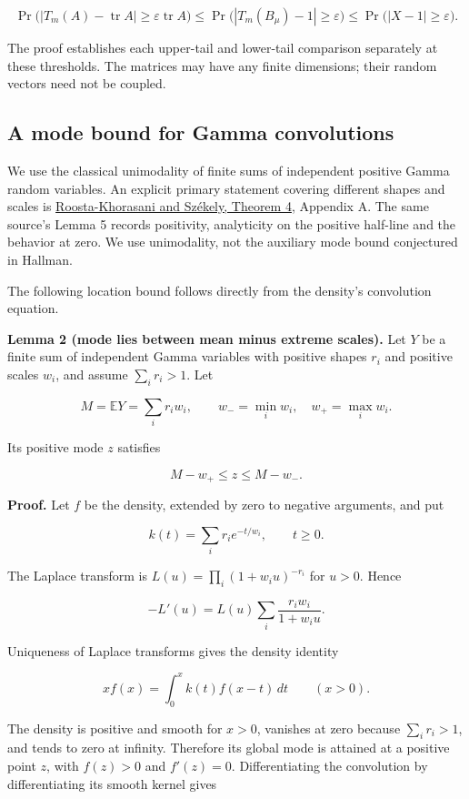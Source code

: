 \documentclass[10pt,a4paper]{article}
\begin{document}
\[
\Pr\bigl(|T_m(A)-\operatorname{tr}A|\ge\varepsilon\operatorname{tr}A\bigr)
\le\Pr\bigl(|T_m(B_\mu)-1|\ge\varepsilon\bigr)
\le\Pr\bigl(|X-1|\ge\varepsilon\bigr).
\]

The proof establishes each upper-tail and lower-tail comparison
separately at these thresholds. The matrices may have any finite
dimensions; their random vectors need not be coupled.

\subsection{A mode bound for Gamma
convolutions}\label{a-mode-bound-for-gamma-convolutions}

We use the classical unimodality of finite sums of independent positive
Gamma random variables. An explicit primary statement covering different
shapes and scales is
\href{https://arxiv.org/html/1601.04731v1}{Roosta-Khorasani and Székely,
Theorem 4}, Appendix A. The same source's Lemma 5 records positivity,
analyticity on the positive half-line and the behavior at zero. We use
unimodality, not the auxiliary mode bound conjectured in Hallman.

The following location bound follows directly from the density's
convolution equation.

\textbf{Lemma 2 (mode lies between mean minus extreme scales).} Let
\(Y\) be a finite sum of independent Gamma variables with positive
shapes \(r_i\) and positive scales \(w_i\), and assume \(\sum_i r_i>1\).
Let

\[
M=\mathbb EY=\sum_i r_iw_i,
\qquad w_- =\min_iw_i,\quad w_+=\max_iw_i.
\]

Its positive mode \(z\) satisfies

\[
M-w_+\le z\le M-w_-.
\]

\textbf{Proof.} Let \(f\) be the density, extended by zero to negative
arguments, and put

\[
k(t)=\sum_i r_i e^{-t/w_i},\qquad t\ge0.
\]

The Laplace transform is \(L(u)=\prod_i(1+w_i u)^{-r_i}\) for \(u>0\).
Hence

\[
-L'(u)=L(u)\sum_i\frac{r_iw_i}{1+w_i u}.
\]

Uniqueness of Laplace transforms gives the density identity

\[
xf(x)=\int_0^x k(t)f(x-t)\,dt\qquad(x>0).
\]

The density is positive and smooth for \(x>0\), vanishes at zero because
\(\sum_i r_i>1\), and tends to zero at infinity. Therefore its global
mode is attained at a positive point \(z\), with \(f(z)>0\) and
\(f'(z)=0\). Differentiating the convolution by differentiating its
smooth kernel gives
\end{document}
